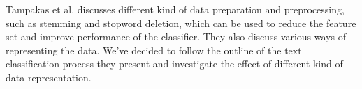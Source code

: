 Tampakas et al. discusses different kind of data preparation and preprocessing, such as stemming and stopword deletion, which can be used to reduce the feature set and improve performance of the classifier. They also discuss various ways of representing the data. We've decided to follow the outline of the text classification process they present and investigate the effect of different kind of data representation. \cite{Ikonomakis05TextClassification}
